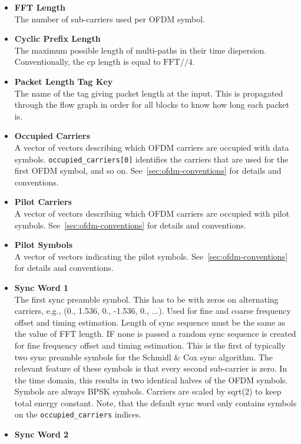 \begin{itemize}
    \item \textbf{FFT Length}\\
    The number of sub-carriers used per OFDM symbol. 
    \item \textbf{Cyclic Prefix Length}\\
    The maximum possible length of multi-paths in their time dispersion. Conventionally, the \gls{cp} length is equal to $\text{FFT}//4$.
    \item \textbf{Packet Length Tag Key}\\
    The name of the tag giving packet length at the input. This is propagated through the flow graph in order for all blocks to know how long each packet is.
    \item \textbf{Occupied Carriers}\\
    A vector of vectors describing which OFDM carriers are occupied with data symbols. \texttt{occupied_carriers[0]} identifies the carriers that are used for the first OFDM symbol, and so on. See~\cref{sec:ofdm-conventions} for details and conventions.
    \item \textbf{Pilot Carriers}\\
    A vector of vectors describing which OFDM carriers are occupied with pilot symbols. See~\cref{sec:ofdm-conventions} for details and conventions.
    \item \textbf{Pilot Symbols}\\
    A vector of vectors indicating the pilot symbols. See~\cref{sec:ofdm-conventions} for details and conventions.
    \item \textbf{Sync Word 1}\\
    The first sync preamble symbol. This has to be with zeros on alternating carriers, e.g., (0., 1.536, 0., -1.536, 0., ...). Used for fine and coarse frequency offset and timing estimation. Length of sync sequence must be the same as the value of FFT length. IF none is passed a random sync sequence is created for fine frequency offset and timing estimation. This is the first of typically two sync preamble symbols for the Schmidl \& Cox sync algorithm.
    The relevant feature of these symbols is that every second sub-carrier
    is zero. In the time domain, this results in two identical halves of
    the OFDM symbols. Symbols are always BPSK symbols. Carriers are scaled by sqrt(2) to keep total energy constant. Note, that the default sync word only contains symbols on the \texttt{occupied_carriers} indices.
    \item  \textbf{Sync Word 2}\\

\end{itemize}
